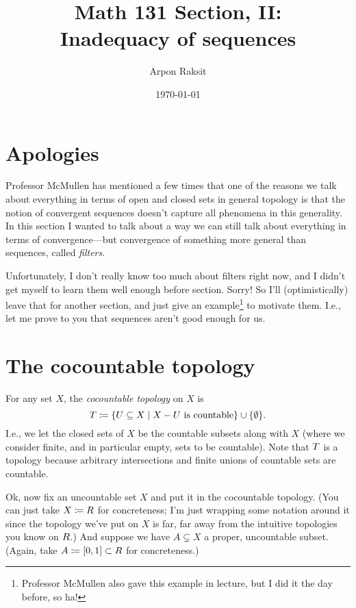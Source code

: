 


\title{Math 131 Section, II:\\Inadequacy of sequences}
\author{Arpon Raksit}
\date{\today}


\maketitle
\thispagestyle{fancy}


\section{Apologies}

Professor McMullen has mentioned a few times that one of the reasons
we talk about everything in terms of open and closed sets in general
topology is that the notion of convergent sequences doesn't capture
all phenomena in this generality. In this section I wanted to talk
about a way we can still talk about everything in terms of
convergence---but convergence of something more general than
sequences, called \textit{filters}.

Unfortunately, I don't really know too much about filters right now,
and I didn't get myself to learn them well enough before
section. Sorry! So I'll (optimistically) leave that for another
section, and just give an example\footnote{Professor McMullen also
  gave this example in lecture, but I did it the day before, so ha!}
to motivate them. I.e., let me prove to you that sequences aren't good
enough for us.

\section{The cocountable topology}

\begin{definition}
  For any set $X$, the \textit{cocountable topology} on $X$ is
\[
T \coloneqq \{U \subseteq X \mid X - U \text{ is countable}\} \cup
\{\emptyset\}.
\]
I.e., we let the closed sets of $X$ be the countable subsets along
with $X$ (where we consider finite, and in particular empty, sets to
be countable). Note that $T$ is a topology because arbitrary
intersections and finite unions of countable sets are countable.
\end{definition}

Ok, now fix an uncountable set $X$ and put it in the cocountable
topology. (You can just take $X \coloneqq R$ for concreteness; I'm just
wrapping some notation around it since the topology we've put on $X$
is far, far away from the intuitive topologies you know on $R$.)  And
suppose we have $A \subsetneq X$ a proper, uncountable subset. (Again,
take $A \coloneqq [0, 1] \subset R$ for concreteness.)

